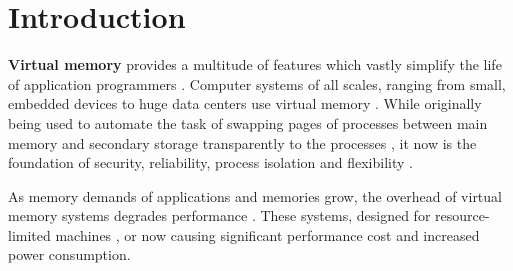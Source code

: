 \chapter{Introduction} %


















\textbf{Virtual memory} provides a multitude of features which vastly simplify the life of application programmers \cite{jacob1998virtualissues}. Computer systems of all scales, ranging from small, embedded devices to huge data centers use virtual memory \cite{bhattacharjee2017architectural}.
While originally being used to automate the task of swapping pages of processes between main memory and secondary storage transparently to the processes \cite{jacob1998virtualissues}, it now is the foundation of security, reliability, process isolation and flexibility \cite{wales1999virtual,jacobVirtualMemoryContemporary1998}.

As memory demands of applications and memories grow, the overhead of virtual memory systems degrades performance \cite{zagieboylo2020cost}. These systems, designed for resource-limited machines \cite{halbuer2023morsels}, or now causing significant performance cost and increased power consumption.

